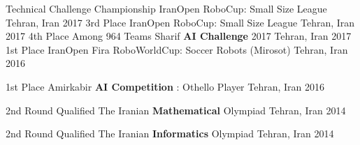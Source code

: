 

\begin{cvhonors}
  \cvhonor
    {Technical Challenge Championship} %
    {IranOpen RoboCup: Small Size League} %
    {Tehran, Iran} %
    {2017} %
  \cvhonor
    {3rd Place} %
    {IranOpen RoboCup: Small Size League} %
    {Tehran, Iran} %
    {2017} %
  \cvhonor
    {4th Place Among 964 Teams} %
    {Sharif \textbf{AI Challenge} 2017} %
    {Tehran, Iran} %
    {2017} %
  \cvhonor
    {1st Place} %
    {IranOpen Fira RoboWorldCup: Soccer Robots (Mirosot)} %
    {Tehran, Iran} %
    {2016} %

  \cvhonor
    {1st Place} %
    {Amirkabir \textbf{AI Competition} : Othello Player} %
    {Tehran, Iran} %
    {2016} %
    
  \cvhonor
    {2nd Round Qualified} %
    {The Iranian \textbf{Mathematical} Olympiad} %
    {Tehran, Iran} %
    {2014} %
    
  \cvhonor
    {2nd Round Qualified} %
    {The Iranian \textbf{Informatics} Olympiad} %
    {Tehran, Iran} %
    {2014} %
    
\end{cvhonors}
